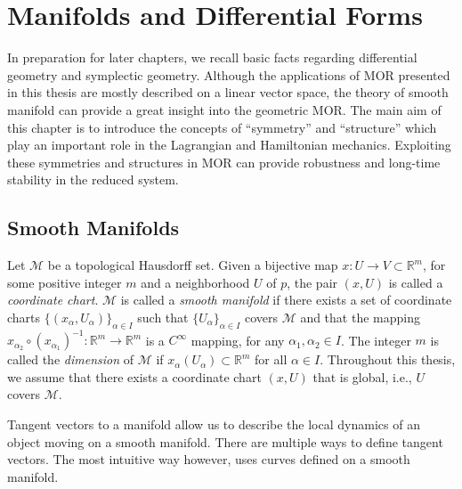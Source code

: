 \chapter{Manifolds and Differential Forms} \label{chapter:2}

In preparation for later chapters, we recall basic facts regarding differential geometry and symplectic geometry. Although the applications of MOR presented in this thesis are mostly described on a linear vector space, the theory of smooth manifold can provide a great insight into the geometric MOR. The main aim of this chapter is to introduce the concepts of ``symmetry'' and ``structure'' which play an important role in the Lagrangian and Hamiltonian mechanics. Exploiting these symmetries and structures in MOR can provide robustness and long-time stability in the reduced system.

\section{Smooth Manifolds} \label{section:2.1}
Let $\mathcal M$ be a topological Hausdorff \cite{friedman1970foundations} set. Given a bijective map $x:U\to V\subset \mathbb R^{m}$, for some positive integer $m$ and a neighborhood $U$ of $p$, the pair $(x,U)$ is called a \emph{coordinate chart}. $\mathcal M$ is called a \emph{smooth manifold} if there exists a set of coordinate charts $\{(x_{\alpha},U_{\alpha})\}_{\alpha\in I}$ such that $\{U_{\alpha}\}_{\alpha\in I}$ covers $\mathcal M$ and that the mapping $x_{\alpha_2}\circ (x_{\alpha_1})^{-1}:\mathbb R^{m} \to \mathbb R^{m}$ is a $C^{\infty}$ mapping, for any $\alpha_1,\alpha_2\in I$. The integer $m$ is called the \emph{dimension} of $\mathcal M$ if $x_{\alpha}(U_{\alpha}) \subset \mathbb R^{m}$ for all $\alpha \in I$. Throughout this thesis, we assume that there exists a coordinate chart $(x,U)$ that is global, i.e., $U$ covers $\mathcal M$.

Tangent vectors to a manifold allow us to describe the local dynamics of an object moving on a smooth manifold. There are multiple ways to define tangent vectors. The most intuitive way however, uses curves defined on a smooth manifold.

